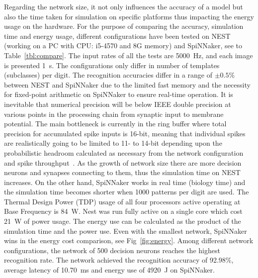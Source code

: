 Regarding the network size, it not only influences the accuracy of a model but also the time taken for simulation on specific platforms thus impacting the energy usage on the hardware.
For the purpose of comparing the accuracy, simulation time and energy usage, different configurations have been tested on NEST (working on a PC with CPU: i5-4570 and 8G memory) and SpiNNaker, see to Table~\ref{tbl:compare}.
The input rates of all the tests are 5000~Hz, and each image is presented 1~s.
The configurations only differ in number of templates (subclasses) per digit.
The recognition accuracies differ in a range of $\pm0.5\%$ between NEST and SpiNNaker due to the limited fast memory and the necessity for fixed-point arithmetic on SpiNNaker to ensure real-time operation.
It is inevitable that numerical precision will be below IEEE double precision at various points in the processing chain from synaptic input to membrane potential.
The main bottleneck is currently in the ring buffer where total precision for accumulated spike inputs is 16-bit, meaning that individual spikes are realistically going to be limited to 11- to 14-bit depending upon the probabilistic headroom calculated as necessary from the network configuration and spike throughput~\cite{Hopkins2015Accuracy}.
As the growth of network size there are more decision neurons and synapses connecting to them, thus the simulation time on NEST increases.
On the other hand, SpiNNaker works in real time (biology time) and the simulation time becomes shorter when 1000 patterns per digit are used.
The Thermal Design Power (TDP) usage of all four processors active operating at Base Frequency is 84~W.
Nest was run fully active on a single core which cost 21~W of power usage.
The energy use can be calculated as the product of the simulation time and the power use.
Even with the smallest network, SpiNNaker wins in the energy cost comparison, see Fig~\ref{fig:energy}.
Among different network configurations, the network of 500 decision neurons reaches the highest recognition rate.
The network achieved the recognition accuracy of 92.98\%, average latency of 10.70~ms and energy use of 4920~J on SpiNNaker.

